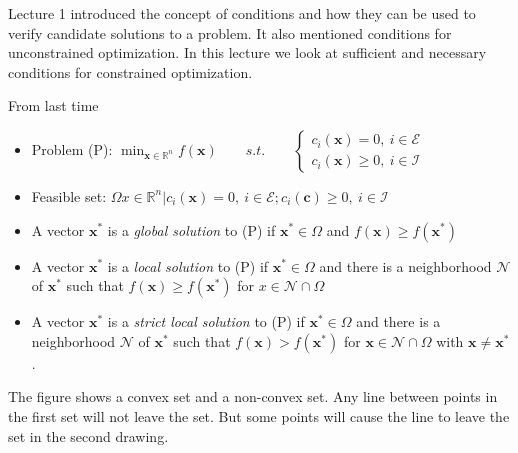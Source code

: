 \documentclass{article}
\begin{document}
\maketitle

Lecture 1 introduced the concept of conditions and how they can be used to verify candidate solutions
to a problem. It also mentioned conditions for unconstrained optimization. In this lecture we look at
sufficient and necessary conditions for constrained optimization.

From last time

\begin{itemize}
  \item Problem (P): $\min_{\mathbf{x}\in \mathbb{R}^{n}} f(\mathbf{x}) \qquad s.t. \qquad
          \left\{
          \begin{aligned}
            c_i(\mathbf{x}) = 0,\ i\in \mathcal{E} \\
            c_i(\mathbf{x}) \geq 0,\  i\in \mathcal{I}
          \end{aligned}
          \right. $
  \item Feasible set: $\Omega {x \in \mathbb{R}^{n} | c_i(\mathbf{x}) = 0,\ i\in\mathcal{E}; c_i(\mathbf{c}) \geq 0,\  i\in \mathcal{I}}$
  \item A vector $\mathbf{x^*}$ is a \textit{global solution} to (P) if $\mathbf{x^*}\in \Omega$ and $f(\mathbf{x}) \geq f(\mathbf{x^*})$
  \item A vector $\mathbf{x^*}$ is a \textit{local solution} to (P) if $\mathbf{x^*}\in \Omega$ and there is a neighborhood $\mathcal{N}$ of $\mathbf{x^*}$ such that
        $f(\mathbf{x}) \geq f(\mathbf{x^*})$ for $x \in\mathcal{N}\cap\Omega$
  \item A vector $\mathbf{x^*}$ is a \textit{strict local solution} to (P) if $\mathbf{x^*}\in \Omega$ and there is a
        neighborhood $\mathcal{N}$ of $\mathbf{x^*}$ such that $f(\mathbf{x}) > f(\mathbf{x^*})$ for $\mathbf{x} \in\mathcal{N}\cap\Omega$ with $\mathbf{x} \neq \mathbf{x^*}$.
\end{itemize}

\begin{center}
\end{center}

The figure shows a convex set and a non-convex set. Any line between points in the first set will not leave the set. But some points will cause the line to leave the set
in the second drawing.
\end{document}
